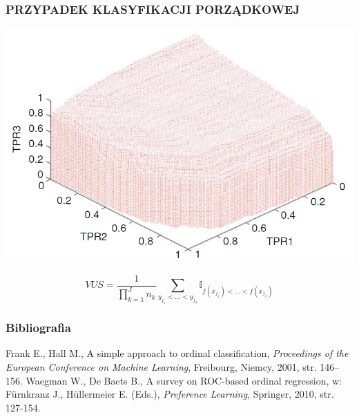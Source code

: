 \documentclass[11pt,usenames,dvipsnames,svgnames,x11names]{beamer}
\theoremstyle{plain}
\theoremstyle{definition}
\theoremstyle{remark}
\begin{document}
\begin{frame}
\frametitle{PRZYPADEK KLASYFIKACJI PORZĄDKOWEJ}
\centering
\includegraphics[scale=0.4]{roc3d.png}

$$
VUS = \dfrac{1}{\prod_{k=1}^J n_k}\sum_{y_{j_1}<\ldots<y_{j_J}} \mathbb{I}_{f(x_{j_1})<\ldots<f(x_{j_J})}
$$

\end{frame}



\begin{frame}
	\frametitle{Bibliografia}
	\begin{thebibliography}{9}
		\bibitem{} Frank E., Hall M., A simple approach to ordinal classification, \emph{Proceedings of the European Conference on Machine Learning}, Freibourg, Niemcy, 2001, str. 146--156.
		\bibitem{} Waegman W., De Baets B., A survey on ROC-based ordinal regression, w: Fürnkranz J., Hüllermeier E. (Eds.), \emph{Preference Learning}, Springer, 2010, str. 127-154.
	\end{thebibliography}
\end{frame}
\end{document}
